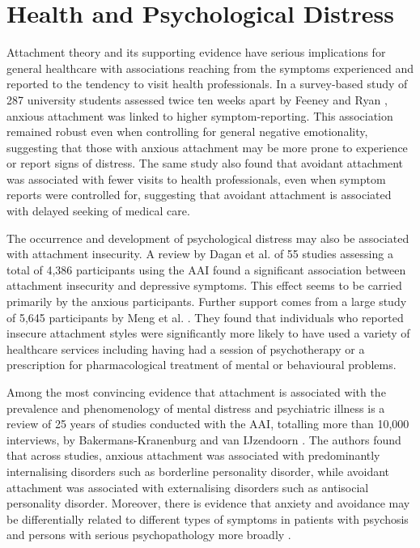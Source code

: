 \documentclass[12pt]{report}
\begin{document}
\section{Health and Psychological Distress}
\label{sec: Health}
Attachment theory and its supporting evidence have serious implications for general healthcare with associations reaching from the symptoms experienced and reported to the tendency to visit health professionals.
In a survey-based study of 287 university students assessed twice ten weeks apart by Feeney and Ryan \citeyear{Feeney1994}, anxious attachment was linked to higher symptom-reporting. This association remained robust even when controlling for general negative emotionality, suggesting that those with anxious attachment may be more prone to experience or report signs of distress.
The same study also found that avoidant attachment was associated with fewer visits to health professionals, even when symptom reports were controlled for, suggesting that avoidant attachment is associated with delayed seeking of medical care.

The occurrence and development of psychological distress may also be associated with attachment insecurity.
A review by Dagan et al. \citeyear{Dagan2018} of 55 studies assessing a total of 4,386 participants using the AAI found a significant association between attachment insecurity and depressive symptoms.
This effect seems to be carried primarily by the anxious participants.
Further support comes from a large study of 5,645 participants by Meng et al. \citeyear{Meng2015}.
They found that individuals who reported insecure attachment styles were significantly more likely to have used a variety of healthcare services including having had a session of psychotherapy or a prescription for pharmacological treatment of mental or behavioural problems.

Among the most convincing evidence that attachment is associated with the prevalence and phenomenology of mental distress and psychiatric illness is a review of 25 years of studies conducted with the AAI, totalling more than 10,000 interviews, by Bakermans-Kranenburg and van IJzendoorn \citeyear{Bakermanskranenburg2009}.
The authors found that across studies, anxious attachment was associated with predominantly internalising disorders such as borderline personality disorder, while avoidant attachment was associated with externalising disorders such as antisocial personality disorder.
Moreover, there is evidence that anxiety and avoidance may be differentially related to different types of symptoms in patients with psychosis  and persons with serious psychopathology more broadly \cite{Dozier1990}.
\end{document}
